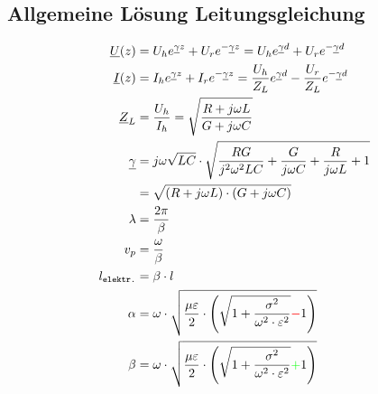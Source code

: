 \subsection{Allgemeine Lösung Leitungsgleichung}
\begin{align*}
    \underline{U}(z)   & = U_h e^{\underline{\gamma} z} + U_r e^{-\underline{\gamma} z} = U_h e^{\underline{\gamma} d} + U_r e^{-\underline{\gamma} d}                       \\
    \underline{I}(z)   & = I_h e^{\underline{\gamma} z} + I_r e^{-\underline{\gamma} z} = \frac{U_h}{Z_L}e^{\underline{\gamma} d} - \frac{U_r}{Z_L}e^{-\underline{\gamma} d} \\
    \underline{Z}_L    & = \frac{U_h}{I_h} = \sqrt{ \frac{R + j \omega L}{G + j \omega C}}                                                                                   \\
    \underline{\gamma} & = j \omega \sqrt{LC} \cdot \sqrt{ \frac{RG}{j^2 \omega^2 LC} + \frac{G}{j \omega C} + \frac{R}{j \omega L} + 1}                                     \\
                       & = \sqrt{(R+j\omega L)\cdot(G+j\omega C)}                                                                                                            \\
    \lambda            & = \frac{2 \pi}{\beta}                                                                                                                               \\
    v_p                & = \frac{\omega}{\beta}                                                                                                                              \\
    l_\texttt{elektr.} & = \beta \cdot l                                                                                                                                     \\
    \alpha             & = \omega \cdot \sqrt{\dfrac{\mu \varepsilon}{2}\cdot \left(\sqrt{1+\dfrac{\sigma^2}{\omega^2\cdot\varepsilon^2}}{\color{red}{-}}1\right)}           \\
    \beta              & = \omega \cdot \sqrt{\dfrac{\mu \varepsilon}{2}\cdot \left(\sqrt{1+\dfrac{\sigma^2}{\omega^2\cdot\varepsilon^2}}{\color{green}{+}}1\right)}
\end{align*}


